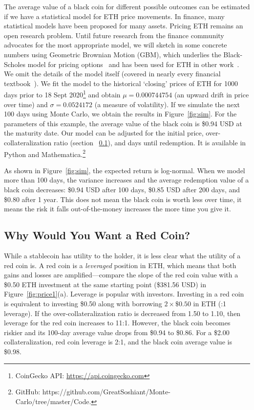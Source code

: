 The average value of a black coin for different possible outcomes can be estimated if we have a statistical model for ETH price movements. In finance, many statistical models have been proposed for many assets. Pricing ETH remains an open research problem. Until future research from the finance community advocates for the most appropriate model, we will sketch in some concrete numbers using Geometric Brownian Motion (GBM), which underlies the Black-Scholes model for pricing options~\cite{BS73} and has been used for ETH in other work~\cite{GPH+20}. We omit the details of the model itself (covered in nearly every  financial textbook~\cite{Sey09}). We fit the model to the historical `closing' prices of ETH for 1000 days prior to 18 Sept 2020\footnote{CoinGecko API: \url{https://api.coingecko.com}} and obtain $\mu=0.000744754$ (an upward drift in price over time) and $\sigma=0.0524172$ (a measure of volatility). If we simulate the next 100 days using Monte Carlo, we obtain the results in Figure~\ref{fig:sim}. For the parameters of this example, the average value of the black coin is \$0.94 USD at the maturity date. Our model can be adjusted for the initial price, over-collateralization ratio (section ~\ref{sec:redchar}), and days until redemption. It is available in Python and Mathematica.\footnote{GitHub: https://github.com/GreatSoshiant/Monte-Carlo/tree/master/Code.} 

As shown in Figure~\ref{fig:sim}, the expected return is log-normal. When we model more than 100 days, the variance increases and the average redemption value of a black coin decreases: \$0.94 USD after 100 days, \$0.85 USD after 200 days, and \$0.80 after 1 year. This does not mean the black coin is worth less over time, it means the risk it falls out-of-the-money increases the more time you give it. 


\subsection{Why Would You Want a Red Coin?}
\label{sec:redchar}

While a stablecoin has utility to the holder, it is less clear what the utility of a red coin is. A red coin is a \textit{leveraged} position in ETH, which means that both gains and losses are amplified---compare the slope of the red coin value with a \$0.50 ETH investment at the same starting point (\$381.56 USD) in Figure~\ref{fig:price1}(a). Leverage is popular with investors. Investing in a red coin is equivalent to investing \$0.50 along with borrowing $2\times\$0.50$ in ETH (:1 leverage). If the over-collateralization ratio is decreased from 1.50 to 1.10, then leverage for the red coin increases to 11:1. However, the black coin becomes riskier and its 100-day average value drops from \$0.94 to \$0.86. For a \$2.00 collateralization, red coin leverage is 2:1, and the black coin average value is \$0.98. 

